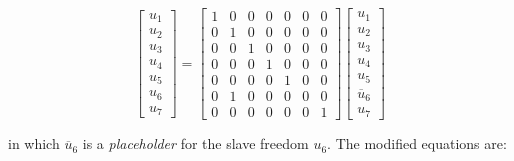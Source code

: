 \begin{equation}
    \begin{bmatrix}
        u_1 \\
        u_2 \\
        u_3 \\
        u_4 \\
        u_5 \\
        u_6 \\
        u_7
    \end{bmatrix}
    = \begin{bmatrix}
        1 & 0 & 0 & 0 & 0 & 0 & 0 \\
        0 & 1 & 0 & 0 & 0 & 0 & 0 \\
        0 & 0 & 1 & 0 & 0 & 0 & 0 \\
        0 & 0 & 0 & 1 & 0 & 0 & 0 \\
        0 & 0 & 0 & 0 & 1 & 0 & 0 \\
        0 & 1 & 0 & 0 & 0 & 0 & 0 \\
        0 & 0 & 0 & 0 & 0 & 0 & 1
    \end{bmatrix}
    \begin{bmatrix}
        u_1 \\
        u_2 \\
        u_3 \\
        u_4 \\
        u_5 \\
        \overline{u}_6 \\
        u_7
    \end{bmatrix}
\end{equation}

in which $ \overline{u}_6 $ is a \textit{placeholder} for the slave freedom $ u_6 $.
The modified equations are:

